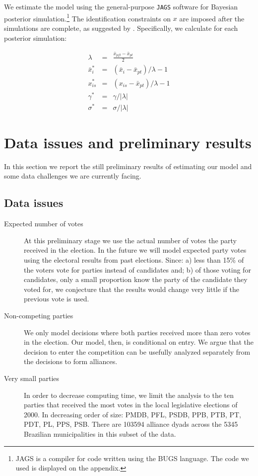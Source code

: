 We estimate the model using the general-purpose \texttt{JAGS} \citep{plummer:2007} software for Bayesian posterior simulation.\footnote{JAGS is a compiler for code written using the BUGS language. The code we used is displayed on the appendix.}  The identification constraints on $x$ are imposed after the simulations are complete, as suggested by \citet{bafumi:2005}. Specifically, we  calculate for each posterior simulation:

\begin{eqnarray}
   \label{eq:2}
   \lambda&=&\frac{\bar x_{pfl}-\bar x_{pt}}{2}\\
   \bar x_{i}^*&=&(\bar x_{i}-\bar x_{pt})/\lambda-1\\
   x_{is}^*&=&(x_{is}-\bar x_{pt})/\lambda-1\\
   \gamma^*&=&\gamma/|\lambda|\\
   \sigma^*&=&\sigma/|\lambda|
 \end{eqnarray}


 \section{Data issues and  preliminary results}
 \label{sec:results}  

 In this section we report the still preliminary results of estimating our model and some data challenges we are currently facing.
 
 \subsection{Data issues}
 \label{sec:data-issues}

\begin{description}
\item[Expected number of votes] At this preliminary stage we use the actual number of votes the party received in the election. In the future we will model expected party votes using the electoral results from past elections. Since: a) less than 15\% of the voters vote for parties instead of candidates and; b) of those voting for candidates, only a small proportion know the party of the candidate they voted for, we conjecture that the results would  change very little if  the previous vote is used. 
\item[Non-competing parties] We only model decisions where both parties received more than zero votes in the election. Our model, then, is conditional on entry. We argue that the decision to enter the competition can be usefully analyzed separately from the decisions to form alliances. 
\item[Very small parties]  In order to decrease computing time, we limit the analysis to the ten parties that received the most votes in the local legislative elections of 2000. In decreasing order of size: PMDB, PFL, PSDB, PPB, PTB, PT, PDT, PL, PPS, PSB. There are 103594 alliance dyads across the 5345 Brazilian municipalities in this subset of the data. 
\end{description}

